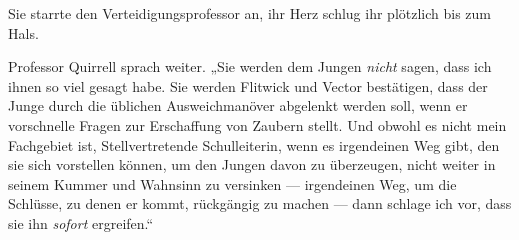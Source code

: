 Sie starrte den Verteidigungsprofessor an, ihr Herz schlug ihr plötzlich bis zum Hals.

Professor Quirrell sprach weiter.
„Sie werden dem Jungen \emph{nicht} sagen, dass ich ihnen so viel gesagt habe. Sie werden Flitwick und Vector bestätigen, dass der Junge durch die üblichen Ausweichmanöver abgelenkt werden soll, wenn er vorschnelle Fragen zur Erschaffung von Zaubern stellt. Und obwohl es nicht mein Fachgebiet ist, Stellvertretende Schulleiterin, wenn es irgendeinen Weg gibt, den sie sich vorstellen können, um den Jungen davon zu überzeugen, nicht weiter in seinem Kummer und Wahnsinn zu versinken — irgendeinen Weg, um die Schlüsse, zu denen er kommt, rückgängig zu machen — dann schlage ich vor, dass sie ihn \emph{sofort} ergreifen.“
